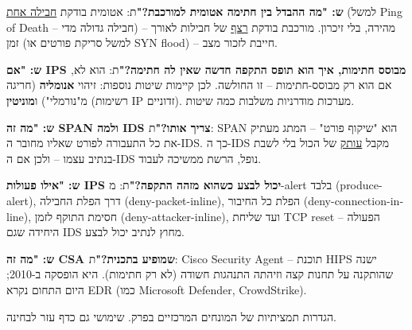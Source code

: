 \documentclass[11pt]{article}
\newcommand{\enLR}[1]{\textenglish{#1}}
\newcommand{\sectionheading}[1]{\vskip10pt\penalty-200{\large\bfseries\color{h2}#1\par}\vskip3pt}
\begin{document}
\textbf{ש: "מה ההבדל בין חתימה אטומית למורכבת?"}\newline ת: אטומית בודקת \underline{חבילה אחת} (למשל \enLR{Ping of Death} – חבילה גדולה מדי) – מהירה, בלי זיכרון. מורכבת בודקת \underline{רצף} של חבילות לאורך זמן (למשל סריקת פורטים או \enLR{SYN flood)} – חייבת לזכור מצב.\par

\textbf{ש: "אם \enLR{IPS} מבוסס חתימות, איך הוא תופס התקפה חדשה שאין לה חתימה?"}\newline ת: הוא לא, אם הוא רק מבוסס-חתימות – זו החולשה. לכן קיימות שיטות נוספות: זיהוי \textbf{אנומליה} (חריגה מ"נורמלי") ו\textbf{מוניטין} (רשימות \enLR{IP} זדוניים). מערכות מודרניות משלבות כמה שיטות.\par

\textbf{ש: "מה זה \enLR{SPAN} ולמה \enLR{IDS} צריך אותו?"}\newline ת: \enLR{SPAN} הוא "שיקוף פורט" – המתג מעתיק את כל התעבורה לפורט שאליו מחובר ה-\enLR{IDS.} כך ה-\enLR{IDS} מקבל \underline{עותק} של הכול בלי לשבת בנתיב עצמו – ולכן אם ה-\enLR{IDS} נופל, הרשת ממשיכה לעבוד.\par

\textbf{ש: "אילו פעולות \enLR{IPS} יכול לבצע כשהוא מזהה התקפה?"}\newline ת: מ-\enLR{alert} בלבד \enLR{(produce-alert)}, דרך הפלת החבילה \enLR{(deny-packet-inline)}, הפלת כל החיבור \enLR{(deny-connection-inline)}, חסימת התוקף לזמן \enLR{(deny-attacker-inline)}, ועד שליחת \enLR{TCP reset} – הפעולה היחידה שגם \enLR{IDS} מחוץ לנתיב יכול לבצע.\par

\textbf{ש: "מה זה \enLR{CSA} שמופיע בתכנית?"}\newline ת: \enLR{Cisco Security Agent} – תוכנת \enLR{HIPS} ישנה שהותקנה על תחנות קצה וזיהתה התנהגות חשודה (לא רק חתימות). היא הופסקה ב-\enLR{2010}; היום התחום נקרא \enLR{EDR} (כמו \enLR{Microsoft Defender, CrowdStrike).}\par

\sectionheading{מילון מונחים – הגדרות}

הגדרות תמציתיות של המונחים המרכזיים בפרק. שימושי גם כדף עזר לבחינה.\par
\end{document}
